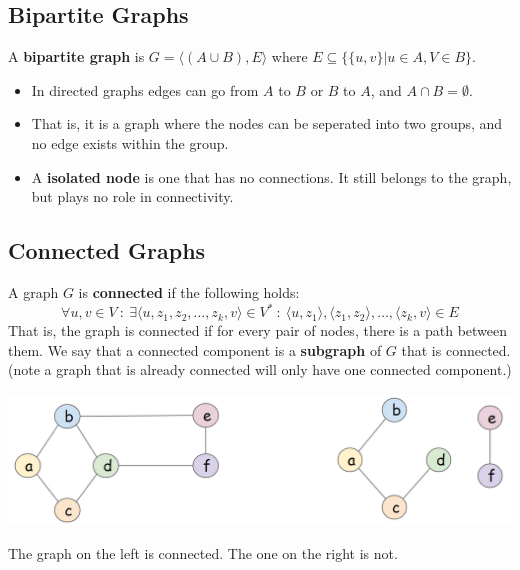 \documentclass[10pt]{article}
\begin{document}
\subsection*{Bipartite Graphs}
A \textbf{bipartite graph} is $G = \langle (A \cup B), E \rangle$ where $E \subseteq \{\{u, v\}|u \in A, V \in B\}$.
\begin{itemize}
	\item In directed graphs edges can go from $A$ to $B$ or $B$ to $A$, and $A \cap B = \emptyset$.
	\item That is, it is a graph where the nodes can be seperated into two groups, and no edge exists within the group.
	\item A \textbf{isolated node} is one that has no connections.  It still belongs to the graph, but plays no role in connectivity.
\end{itemize}

\subsection*{Connected Graphs}
A graph $G$ is \textbf{connected} if the following holds:
\[\forall u, v \in V \::\: \exists \langle u, z_1, z_2, \dots, z_k, v\rangle \in V^* \::\: \langle u, z_1 \rangle, \langle z_1, z_2 \rangle, \dots, \langle z_k, v \rangle \in E\]
That is, the graph is connected if for every pair of nodes, there is a path between them.  We say that a connected component is a \textbf{subgraph} of $G$ that is connected.  (note a graph that is already connected will only have one connected component.)
\begin{center} 
	\includegraphics*[width=\textwidth]{M4_6.png} 
\end{center}
The graph on the left is connected.  The one on the right is not.
\end{document}
